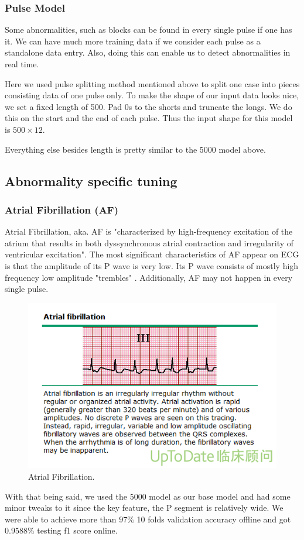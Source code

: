 \documentclass[%
 reprint,
 amsmath,amssymb,
 aps,
]{revtex4-2}
\begin{document}
\subsubsection{Pulse Model}
Some abnormalities, such as blocks can be found in every single pulse if one has it. We can have much more training data if we consider each pulse as a standalone data entry. Also, doing this can enable us to detect abnormalities in real time. 

Here we used pulse splitting method mentioned above to split one case into pieces consisting data of one pulse only. To make the shape of our input data looks nice, we set a fixed length of 500. Pad 0s to the shorts and truncate the longs. We do this on the start and the end of each pulse. Thus the input shape for this model is $500 \times 12$.  

Everything else besides length is pretty similar to the 5000 model above.

\subsection{Abnormality specific tuning}
\subsubsection{Atrial Fibrillation (AF)}
Atrial Fibrillation, aka. AF is "characterized by high-frequency excitation of the atrium that results in both dyssynchronous atrial contraction and irregularity of ventricular excitation"\cite{Staerk}. The most significant characteristics of AF appear on ECG is that the amplitude of its P wave is very low. Its P wave consists of mostly high frequency low amplitude "trembles" \cite{Husser}. Additionally, AF may not happen in every single pulse.
\begin{figure}[H]
	\includegraphics[width=\linewidth]{img/AF.png}
	\caption{\label{fig:AF} Atrial Fibrillation. \cite{Kumar}}
\end{figure}
With that being said, we used the 5000 model as our base model and had some minor tweaks to it since the key feature, the P segment is relatively wide. We were able to achieve more than $97\%$ 10 folds validation accuracy offline and got $0.9588\%$ testing f1 score online.
\end{document}
